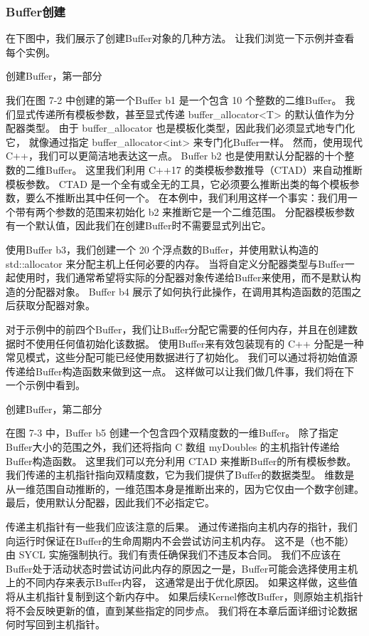 \subsubsection{Buffer创建}
在下图中，我们展示了创建Buffer对象的几种方法。 让我们浏览一下示例并查看每个实例。

{\color{red} 创建Buffer，第一部分}

我们在图 7-2 中创建的第一个Buffer b1 是一个包含 10 个整数的二维Buffer。 
我们显式传递所有模板参数，甚至显式传递 buffer\_allocator<T> 的默认值作为分配器类型。 
由于 buffer\_allocator 也是模板化类型，因此我们必须显式地专门化它，
就像通过指定 buffer\_allocator<int> 来专门化Buffer一样。 然而，使用现代 C++，我们可以更简洁地表达这一点。 
Buffer b2 也是使用默认分配器的十个整数的二维Buffer。 
这里我们利用 C++17 的类模板参数推导（CTAD）来自动推断模板参数。 
CTAD 是一个全有或全无的工具，它必须要么推断出类的每个模板参数，要么不推断出其中任何一个。 
在本例中，我们利用这样一个事实：我们用一个带有两个参数的范围来初始化 b2 来推断它是一个二维范围。 
分配器模板参数有一个默认值，因此我们在创建Buffer时不需要显式列出它。

使用Buffer b3，我们创建一个 20 个浮点数的Buffer，并使用默认构造的 std::allocator 来分配主机上任何必要的内存。 
当将自定义分配器类型与Buffer一起使用时，我们通常希望将实际的分配器对象传递给Buffer来使用，而不是默认构造的分配器对象。 
Buffer b4 展示了如何执行此操作，在调用其构造函数的范围之后获取分配器对象。

对于示例中的前四个Buffer，我们让Buffer分配它需要的任何内存，并且在创建数据时不使用任何值初始化该数据。 
使用Buffer来有效包装现有的 C++ 分配是一种常见模式，这些分配可能已经使用数据进行了初始化。 
我们可以通过将初始值源传递给Buffer构造函数来做到这一点。 这样做可以让我们做几件事，我们将在下一个示例中看到。

{\color{red} 创建Buffer，第二部分}

在图 7-3 中，Buffer b5 创建一个包含四个双精度数的一维Buffer。 
除了指定Buffer大小的范围之外，我们还将指向 C 数组 myDoubles 的主机指针传递给Buffer构造函数。 
这里我们可以充分利用 CTAD 来推断Buffer的所有模板参数。 
我们传递的主机指针指向双精度数，它为我们提供了Buffer的数据类型。 
维数是从一维范围自动推断的，一维范围本身是推断出来的，因为它仅由一个数字创建。 
最后，使用默认分配器，因此我们不必指定它。

传递主机指针有一些我们应该注意的后果。 
通过传递指向主机内存的指针，我们向运行时保证在Buffer的生命周期内不会尝试访问主机内存。 
这不是（也不能）由 SYCL 实施强制执行。我们有责任确保我们不违反本合同。 
我们不应该在Buffer处于活动状态时尝试访问此内存的原因之一是，Buffer可能会选择使用主机上的不同内存来表示Buffer内容，
这通常是出于优化原因。 如果这样做，这些值将从主机指针复制到这个新内存中。 
如果后续Kernel修改Buffer，则原始主机指针将不会反映更新的值，直到某些指定的同步点。 
我们将在本章后面详细讨论数据何时写回到主机指针。

